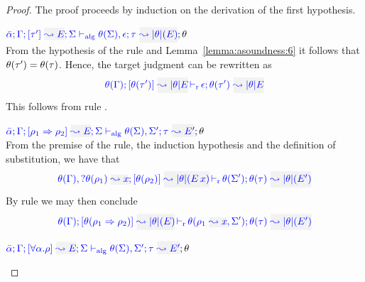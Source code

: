 \begin{proof}
The proof proceeds by induction on the derivation of the first hypothesis.
\begin{description}
\setlength{\itemsep}{1em}
\item[\fbox{\rref{Alg-M-Simp}}]\quad
$\admress{\bar\alpha}{\tenv}{\type'}{E}{\Sigma}{\type}{\etrans\theta(E)}{\theta(\Sigma),\epsilon}{\theta}$\ \\

From the hypothesis of the rule and Lemma~\ref{lemma:asoundness:6} it follows that
$\theta(\tau') = \theta(\tau)$. Hence, the target judgment can be rewritten as
\begin{equation*}
  \dmres{\theta(\tenv)}{\theta(\type')}{\etrans\theta{E}}{\theta(\type')}{\etrans\theta{E}}{\epsilon}
\end{equation*}
This follows from rule .

\item[\fbox{\rref{Alg-M-IApp}}]\quad
$\admress{\bar\alpha}{\tenv}{\rulet_1\To\rulet_2}{E}{\Sigma}{\type}{E'}{\theta(\Sigma),\Sigma'}{\theta}$\ \\

  From the premise of the rule, the induction hypothesis and the definition of substitution,
we have that
\begin{equation*}
  \dmres{\theta(\tenv),\envi{\theta(\rulet_1)}{x}}{\theta(\rulet_2)}{\etrans\theta(\mmapp{E}{x})}{\theta(\type)}{\etrans{\theta}(E')}{\theta(\Sigma')}
\end{equation*}
  By rule  we may then conclude
\begin{equation*}
\dmres{\theta(\tenv)}{\theta(\rulet_1\To\rulet_2)}{\etrans\theta(E)}{\theta(\type)}{\etrans{\theta}(E')}{\theta(\ie{\rulet_1}{x},\Sigma')}
\end{equation*} 

\item[\fbox{\rref{Alg-M-TApp}}]\quad
$\admress{\bar\alpha}{\tenv}{\tall{\alpha}{\rulet}}{E}{\Sigma}{\type}{E'}{\theta(\Sigma),\Sigma'}{\theta}$\ \\


\end{description}
\end{proof}
